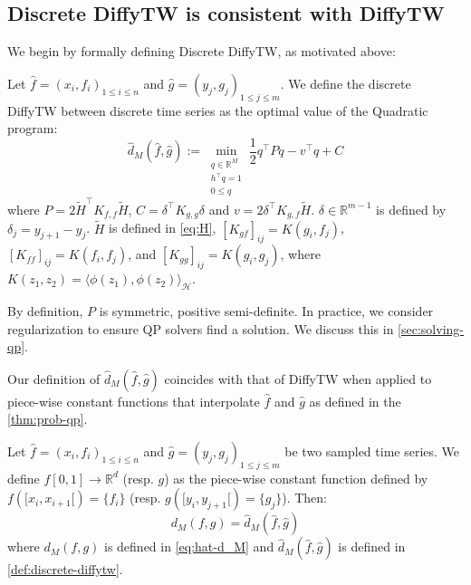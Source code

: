 \subsection{Discrete DiffyTW is consistent with DiffyTW}\label{sec:consistent}
We begin by formally defining Discrete DiffyTW, as motivated above:
\begin{definition}\label{def:discrete-diffytw} Let $\hat f = (x_i, f_i)_{1 \leq i\leq n}$ and $\hat g= (y_j, g_j)_{1\leq j\leq m}$. We define the discrete DiffyTW between discrete time series as the optimal value of the Quadratic program:
\begin{equation}\label{prob:qp}
    \hat d_M(\hat f, \hat g) :=\min_{\substack{q\in\mathbb R^{M}\\h^\top q=1\\0 \leq q}}\frac{1}{2}q^\top Pq - v^\top q + C
\end{equation}
where $P= 2\tilde H^\top K_{f, f}\tilde H$, $C= \delta^\top K_{g,g}\delta$ and $v= 2 \delta^\top K_{g,f}\tilde H$. $\delta\in\mathbb R^{m-1}$ is defined by $\delta_j = y_{j+1} - y_j$. $\tilde H$ is defined in \cref{eq:H}, $[K_{gf}]_{ij} = K(g_i, f_j)$, $[K_{ff}]_{ij} = K(f_i, f_j)$, and $[K_{gg}]_{ij} = K(g_i, g_j)$, where $K(z_1, z_2) = \langle \phi(z_1), \phi(z_2)\rangle_\mathcal H$.
\end{definition}

By definition, $P$ is symmetric, positive semi-definite. In practice, we consider regularization to ensure QP solvers find a solution. We discuss this in \cref{sec:solving-qp}.

Our definition of $\hat d_M(\hat f, \hat g)$ coincides with that of DiffyTW when applied to piece-wise constant functions that interpolate $\hat f$ and $\hat g$ as defined in the \cref{thm:prob-qp}.

\begin{theorem}\label{thm:prob-qp}
Let $\hat f = (x_i, f_i)_{1 \leq i\leq n}$ and $\hat g = (y_j, g_j)_{1 \leq j\leq m}$ be two sampled time series. We define $f[0, 1]\to\mathbb R^d$ (resp. $g$) as the piece-wise constant function defined by $f([x_i, x_{i+1}[) = \lbrace f_i\rbrace$ (resp. $g([y_i, y_{j+1}[) = \lbrace g_j\rbrace$). Then:
\begin{equation}
d_M(f, g) = \hat d_M(\hat f, \hat g)
\end{equation}
where $d_M(f, g)$ is defined in \cref{eq:hat-d_M} and $\hat d_M(\hat f, \hat g)$ is defined in \cref{def:discrete-diffytw}.
\end{theorem}

